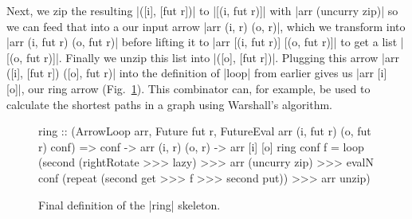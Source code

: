 Next, we zip the resulting |([i], [fut r])| to |[(i, fut r)]| with |arr (uncurry zip)| so we can feed that into a our input arrow |arr (i, r) (o, r)|, which we transform into |arr (i, fut r) (o, fut r)| before lifting it to |arr [(i, fut r)] [(o, fut r)]| to get a list |[(o, fut r)]|. Finally we unzip this list into |([o], [fut r])|. Plugging this arrow |arr ([i], [fut r]) ([o], fut r)| into the definition of |loop| from earlier gives us |arr [i] [o]|, our ring arrow (Fig.~\ref{fig:ringFinal}).
This combinator can, for example, be used to calculate the shortest paths in a graph using Warshall's algorithm.


\begin{figure}[tb]
\begin{code}
ring :: (ArrowLoop arr, Future fut r, FutureEval arr (i, fut r) (o, fut r) conf) =>
    conf -> arr (i, r) (o, r) -> arr [i] [o]
ring conf f =
	loop (second (rightRotate >>> lazy) >>> arr (uncurry zip) >>>
        evalN conf (repeat (second get >>> f >>> second put)) >>> arr unzip)
\end{code}
\caption{Final definition of the |ring| skeleton.}
\label{fig:ringFinal}
\end{figure}

